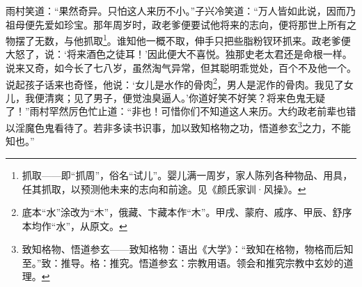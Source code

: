 \par 雨村笑道：“果然奇异。只怕这人来历不小。”子兴冷笑道：“万人皆如此说，因而乃祖母便先爱如珍宝。那年周岁时，政老爹便要试他将来的志向，便将那世上所有之物摆了无数，与他抓取\footnote{抓取——即“抓周”，俗名“试儿”。婴儿满一周岁，家人陈列各种物品、用具，任其抓取，以预测他未来的志向和前途。见《颜氏家训·风操》。}。谁知他一概不取，伸手只把些脂粉钗环抓来。政老爹便大怒了，说：‘将来酒色之徒耳！’因此便大不喜悦。独那史老太君还是命根一样。说来又奇，如今长了七八岁，虽然淘气异常，但其聪明乖觉处，百个不及他一个。说起孩子话来也奇怪，他说：‘女儿是水作的骨肉\footnote{底本“水”涂改为“木”，俄藏、卞藏本作“木”。甲戌、蒙府、戚序、甲辰、舒序本均作“水”，从原文。}，男人是泥作的骨肉。我见了女儿，我便清爽；见了男子，便觉浊臭逼人。’你道好笑不好笑？将来色鬼无疑了！”雨村罕然厉色忙止道：“非也！可惜你们不知道这人来历。大约政老前辈也错以淫魔色鬼看待了。若非多读书识事，加以致知格物之功，悟道参玄\footnote{致知格物、悟道参玄——致知格物：语出《大学》：“致知在格物，物格而后知至。”致：推导。格：推究。悟道参玄：宗教用语。领会和推究宗教中玄妙的道理。}之力，不能知也。”
